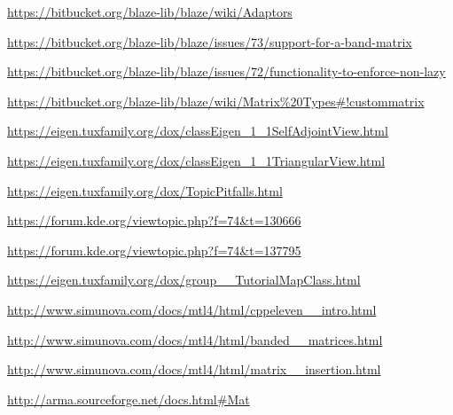 \documentclass{article}
\begin{document}
\begin{thebibliography}{9}

\url{https://bitbucket.org/blaze-lib/blaze/wiki/Adaptors}

\url{https://bitbucket.org/blaze-lib/blaze/issues/73/support-for-a-band-matrix}

\url{https://bitbucket.org/blaze-lib/blaze/issues/72/functionality-to-enforce-non-lazy}

\url{https://bitbucket.org/blaze-lib/blaze/wiki/Matrix%20Types#!custommatrix}

\url{https://eigen.tuxfamily.org/dox/classEigen_1_1SelfAdjointView.html}

\url{https://eigen.tuxfamily.org/dox/classEigen_1_1TriangularView.html}

\url{https://eigen.tuxfamily.org/dox/TopicPitfalls.html}

\url{https://forum.kde.org/viewtopic.php?f=74&t=130666}

\url{https://forum.kde.org/viewtopic.php?f=74&t=137795}

\url{https://eigen.tuxfamily.org/dox/group__TutorialMapClass.html}

\url{http://www.simunova.com/docs/mtl4/html/cppeleven__intro.html}

\url{http://www.simunova.com/docs/mtl4/html/banded__matrices.html}

\url{http://www.simunova.com/docs/mtl4/html/matrix__insertion.html}

\url{http://arma.sourceforge.net/docs.html#Mat}

\end{thebibliography}
\end{document}
